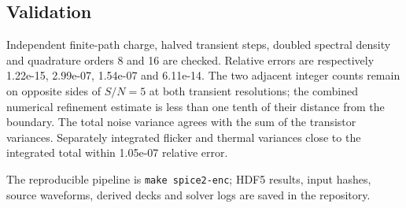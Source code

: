 \documentclass[11pt,a4paper]{article}
\begin{document}
\subsection*{Validation}
Independent finite-path charge, halved transient steps, doubled spectral density
and quadrature orders 8 and 16 are checked. Relative errors are respectively
1.22e-15, 2.99e-07, 1.54e-07 and 6.11e-14. The two adjacent integer
counts remain on opposite sides of $S/N=5$ at both transient resolutions;
the combined numerical refinement estimate is less than one tenth of their
distance from the boundary. The total noise variance agrees with the sum of
the transistor variances. Separately integrated flicker and thermal variances
close to the integrated total within 1.05e-07 relative error.

The reproducible pipeline is \texttt{make spice2-enc}; HDF5 results, input hashes,
source waveforms, derived decks and solver logs are saved in the repository.
\end{document}
